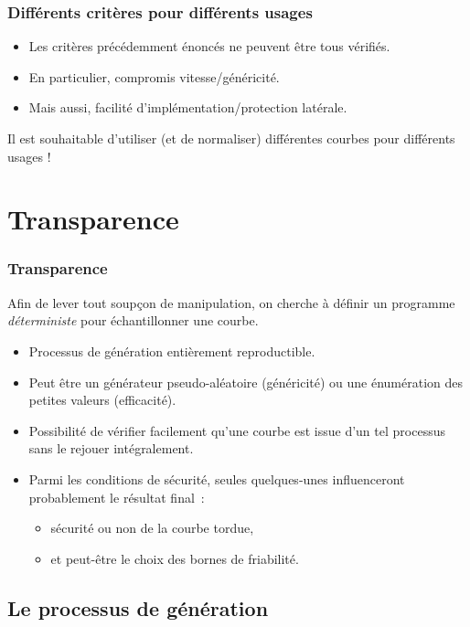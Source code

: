 \documentclass[francais]{beamer}
\begin{document}
\begin{frame}\frametitle{Différents critères pour différents usages}
\begin{itemize}
\item Les critères précédemment énoncés ne peuvent être tous vérifiés.
\item En particulier, compromis vitesse/généricité.
\item Mais aussi, facilité d'implémentation/protection latérale.
\end{itemize}
\begin{block}{}
Il est souhaitable d'utiliser (et de normaliser) différentes courbes
pour différents usages !
\end{block}
\end{frame}

\section{Transparence}

\begin{frame}\frametitle{Transparence}
Afin de lever tout soupçon de manipulation, on cherche à définir
un programme \emph{déterministe} pour échantillonner une courbe.
\begin{itemize}
\item Processus de génération entièrement reproductible.
\item Peut être un générateur pseudo-aléatoire (généricité)
ou une énumération des petites valeurs (efficacité).
\item Possibilité de vérifier facilement qu'une courbe est issue
d'un tel processus sans le rejouer intégralement.
\end{itemize}
\bigskip
\begin{itemize}
\item Parmi les conditions de sécurité, seules quelques-unes
influenceront probablement le résultat final :
\begin{itemize}
\item sécurité ou non de la courbe tordue,
\item et peut-être le choix des bornes de friabilité.
\end{itemize}
\end{itemize}
\end{frame}

\subsection{Le processus de génération}
\end{document}
